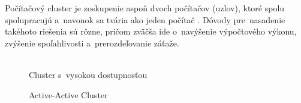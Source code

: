 Počítačový cluster je zoskupenie aspoň dvoch počítačov (uzlov), ktoré spolu spolupracujú a~navonok sa tvária ako jeden počítač \cite{cluster-book}. Dôvody pre~nasadenie takéhoto riešenia sú rôzne, pričom zväčša ide o~navýšenie výpočtového výkonu, zvýšenie spoľahlivosti a~prerozdeľovanie záťaže.
\\\\
\begin{figure}[H]
	\begin{center}
		\caption{Cluster s~vysokou dostupnosťou \cite{cluster-web}}
		\label{cluster}
	\end{center}
\end{figure}

\begin{figure}[H]
	\begin{center}
		\caption{Active-Active Cluster \cite{cluster-web}}
		\label{cluster}
	\end{center}
\end{figure}

